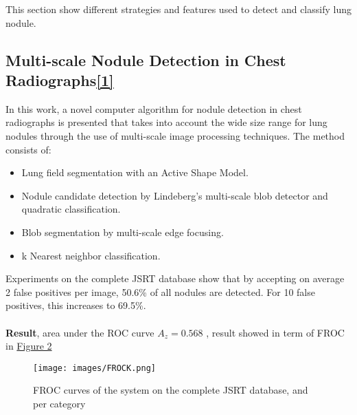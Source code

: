 \documentclass[hidelinks,12pt]{article}
\begin{document}
This section show different strategies and features used to detect and classify lung nodule.

\subsection{Multi-scale Nodule Detection in Chest Radiographs\hyperref[1]{[1]}}

In this work, a novel computer algorithm for nodule detection in chest radiographs is presented that takes into account the wide size range for lung nodules through the use of multi-scale image processing techniques. The method consists of:
\begin{itemize}
    \item Lung field segmentation with an Active Shape Model.
    \item Nodule candidate detection by Lindeberg’s multi-scale blob detector and quadratic classification.
    \item Blob segmentation by multi-scale edge focusing.
    \item k Nearest neighbor classification.
\end{itemize}
Experiments on the complete JSRT database show that by accepting on average 2 false positives
per image, 50.6\% of all nodules are detected. For 10 false positives, this
increases to 69.5\%.\\ \\
\textbf{Result}, area under the ROC curve $A_z = 0.568$ , result showed in term of FROC in \hyperref[fig:1]{Figure 2}
    \begin{figure}[h]
           \texttt{[image: images/FROCK.png]}
           \centering
           \label{fig:1}
           \caption{FROC curves of the system on the complete JSRT database, and per category}
    \end{figure}        

\newpage
\end{document}
